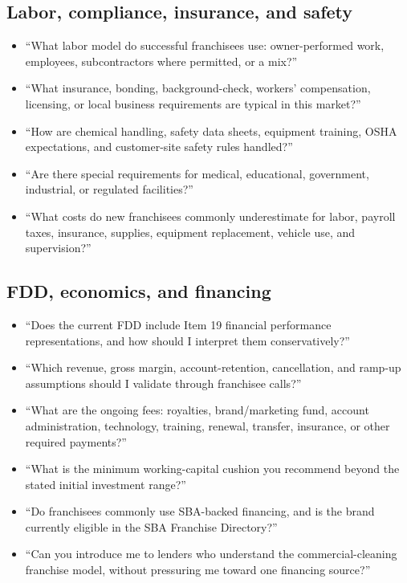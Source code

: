 \documentclass[11pt]{article}
\begin{document}
\subsection{Labor, compliance, insurance, and safety}

\begin{itemize}
  \item ``What labor model do successful franchisees use: owner-performed work, employees, subcontractors where permitted, or a mix?''
  \item ``What insurance, bonding, background-check, workers' compensation, licensing, or local business requirements are typical in this market?''
  \item ``How are chemical handling, safety data sheets, equipment training, OSHA expectations, and customer-site safety rules handled?''
  \item ``Are there special requirements for medical, educational, government, industrial, or regulated facilities?''
  \item ``What costs do new franchisees commonly underestimate for labor, payroll taxes, insurance, supplies, equipment replacement, vehicle use, and supervision?''
\end{itemize}

\subsection{FDD, economics, and financing}

\begin{itemize}
  \item ``Does the current FDD include Item 19 financial performance representations, and how should I interpret them conservatively?''
  \item ``Which revenue, gross margin, account-retention, cancellation, and ramp-up assumptions should I validate through franchisee calls?''
  \item ``What are the ongoing fees: royalties, brand/marketing fund, account administration, technology, training, renewal, transfer, insurance, or other required payments?''
  \item ``What is the minimum working-capital cushion you recommend beyond the stated initial investment range?''
  \item ``Do franchisees commonly use SBA-backed financing, and is the brand currently eligible in the SBA Franchise Directory?''
  \item ``Can you introduce me to lenders who understand the commercial-cleaning franchise model, without pressuring me toward one financing source?''
\end{itemize}
\end{document}
